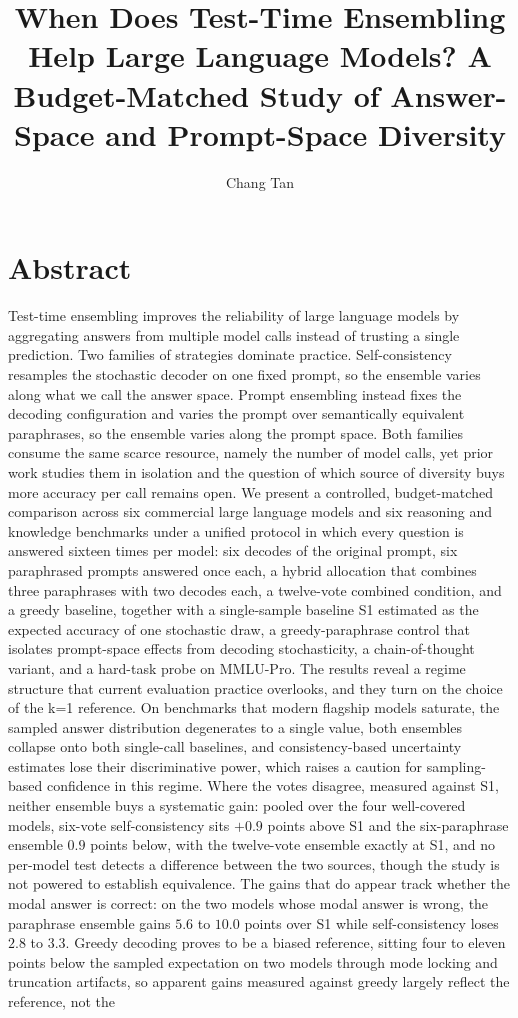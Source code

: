 \documentclass[preprint,12pt]{elsarticle}
\begin{document}
\title{When Does Test-Time Ensembling Help Large Language Models? A Budget-Matched Study of Answer-Space and Prompt-Space Diversity}

\author{Chang Tan}



\section*{Abstract}
Test-time ensembling improves the reliability of large language models by aggregating answers from multiple model calls instead of trusting a single prediction. Two families of strategies dominate practice. Self-consistency resamples the stochastic decoder on one fixed prompt, so the ensemble varies along what we call the answer space. Prompt ensembling instead fixes the decoding configuration and varies the prompt over semantically equivalent paraphrases, so the ensemble varies along the prompt space. Both families consume the same scarce resource, namely the number of model calls, yet prior work studies them in isolation and the question of which source of diversity buys more accuracy per call remains open. We present a controlled, budget-matched comparison across six commercial large language models and six reasoning and knowledge benchmarks under a unified protocol in which every question is answered sixteen times per model: six decodes of the original prompt, six paraphrased prompts answered once each, a hybrid allocation that combines three paraphrases with two decodes each, a twelve-vote combined condition, and a greedy baseline, together with a single-sample baseline S1 estimated as the expected accuracy of one stochastic draw, a greedy-paraphrase control that isolates prompt-space effects from decoding stochasticity, a chain-of-thought variant, and a hard-task probe on MMLU-Pro. The results reveal a regime structure that current evaluation practice overlooks, and they turn on the choice of the k=1 reference. On benchmarks that modern flagship models saturate, the sampled answer distribution degenerates to a single value, both ensembles collapse onto both single-call baselines, and consistency-based uncertainty estimates lose their discriminative power, which raises a caution for sampling-based confidence in this regime. Where the votes disagree, measured against S1, neither ensemble buys a systematic gain: pooled over the four well-covered models, six-vote self-consistency sits $+0.9$ points above S1 and the six-paraphrase ensemble $0.9$ points below, with the twelve-vote ensemble exactly at S1, and no per-model test detects a difference between the two sources, though the study is not powered to establish equivalence. The gains that do appear track whether the modal answer is correct: on the two models whose modal answer is wrong, the paraphrase ensemble gains $5.6$ to $10.0$ points over S1 while self-consistency loses $2.8$ to $3.3$. Greedy decoding proves to be a biased reference, sitting four to eleven points below the sampled expectation on two models through mode locking and truncation artifacts, so apparent gains measured against greedy largely reflect the reference, not the 
\end{document}
